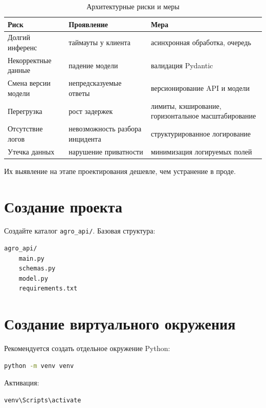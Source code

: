 \documentclass[12pt,a4paper]{article}
\begin{document}
\begin{table}[H]
\centering
\caption{Архитектурные риски и меры}
\label{tab:risks}
\begin{tabular}{|p{4cm}|p{5cm}|p{5cm}|}
\hline
\textbf{Риск} & \textbf{Проявление} & \textbf{Мера} \\
\hline
Долгий инференс & таймауты у клиента & асинхронная обработка, очередь \\
Некорректные данные & падение модели & валидация Pydantic \\
Смена версии модели & непредсказуемые ответы & версионирование API и модели \\
Перегрузка & рост задержек & лимиты, кэширование, горизонтальное масштабирование \\
Отсутствие логов & невозможность разбора инцидента & структурированное логирование \\
Утечка данных & нарушение приватности & минимизация логируемых полей \\
\hline
\end{tabular}
\end{table}

Их выявление на этапе проектирования дешевле, чем устранение в проде.

\section{Создание проекта}

Создайте каталог \texttt{agro\_api/}. Базовая структура:

\begin{lstlisting}[language=bash, caption={Базовая структура проекта}]
agro_api/
    main.py
    schemas.py
    model.py
    requirements.txt
\end{lstlisting}

\section{Создание виртуального окружения}

Рекомендуется создать отдельное окружение Python:

\begin{lstlisting}[language=bash]
python -m venv venv
\end{lstlisting}

Активация:

\begin{lstlisting}[language=bash]
venv\Scripts\activate
\end{lstlisting}
\end{document}
